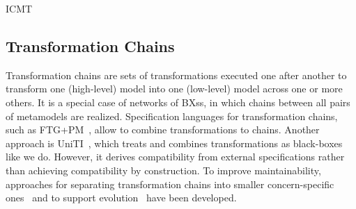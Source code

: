 \begin{copiedFrom}{ICMT}
\subsection*{Transformation Chains}
Transformation chains
are sets of transformations executed one after another to transform one (high-level) model into one (low-level) model across one or more others. %
It is a special case of networks of \acp{BX}s, in which chains between all pairs of metamodels are realized. %
Specification languages for transformation chains, such as FTG+PM~\cite{lucio2013a}, allow to combine transformations to chains.
Another approach is UniTI~\cite{vanhooff2006a, vanhooff2007UniTI-MODELS, pilgrim2008a}, 
which treats and combines transformations as black-boxes like we do. 
However, it derives compatibility from external specifications rather than achieving compatibility by construction.
To improve maintainability, approaches for separating transformation chains into smaller concern-specific ones~\cite{yie2012a} and to support evolution~\cite{yie2009a} have been developed.



\end{copiedFrom}
